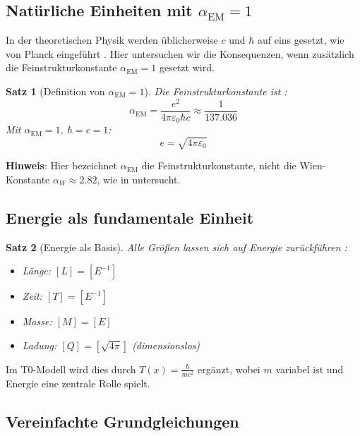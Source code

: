\documentclass[12pt,a4paper]{article}
\newcommand{\Tfield}{T(x)}
\newcommand{\alphaEM}{\alpha_{\text{EM}}}
\newtheorem{theorem}{Satz}[section]
\begin{document}
	\subsection{Natürliche Einheiten mit \(\alphaEM = 1\)}
	
	In der theoretischen Physik werden üblicherweise \(c\) und \(\hbar\) auf eins gesetzt, wie von Planck eingeführt \cite{planck1899}. Hier untersuchen wir die Konsequenzen, wenn zusätzlich die Feinstrukturkonstante \(\alphaEM = 1\) gesetzt wird.
	
	\begin{theorem}[Definition von \(\alphaEM = 1\)]
		Die Feinstrukturkonstante ist \cite{Feynman1985}:
		\begin{equation}
			\alphaEM = \frac{e^2}{4\pi\varepsilon_0 \hbar c} \approx \frac{1}{137.036}
		\end{equation}
		Mit \(\alphaEM = 1\), \(\hbar = c = 1\):
		\begin{equation}
			e = \sqrt{4\pi\varepsilon_0}
		\end{equation}
	\end{theorem}
	
	\textbf{Hinweis}: Hier bezeichnet \(\alphaEM\) die Feinstrukturkonstante, nicht die Wien-Konstante \(\alpha_W \approx 2.82\), wie in \cite{pascher_temp_2025} untersucht.
	
	\subsection{Energie als fundamentale Einheit}
	
	\begin{theorem}[Energie als Basis]
		Alle Größen lassen sich auf Energie zurückführen \cite{Duff2002}:
		\begin{itemize}
			\item Länge: \([L] = [E^{-1}]\)
			\item Zeit: \([T] = [E^{-1}]\)
			\item Masse: \([M] = [E]\)
			\item Ladung: \([Q] = [\sqrt{4\pi}]\) (dimensionslos)
		\end{itemize}
	\end{theorem}
	
	Im T0-Modell wird dies durch \(\Tfield = \frac{\hbar}{m c^2}\) ergänzt, wobei \(m\) variabel ist und Energie eine zentrale Rolle spielt.
	
	\subsection{Vereinfachte Grundgleichungen}
	
\end{document}
